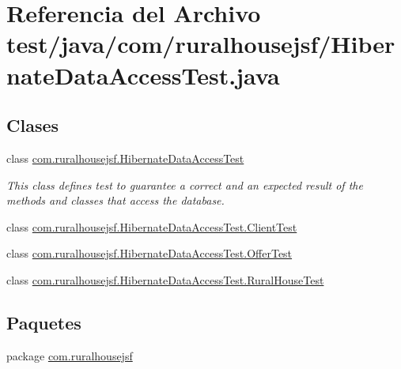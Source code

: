 \hypertarget{a00101}{}\section{Referencia del Archivo test/java/com/ruralhousejsf/\+Hibernate\+Data\+Access\+Test.java}
\label{a00101}
\subsection*{Clases}
\begin{DoxyCompactItemize}
\item 
class \mbox{\hyperlink{a00272}{com.\+ruralhousejsf.\+Hibernate\+Data\+Access\+Test}}
\begin{DoxyCompactList}\small\item\em This class defines test to guarantee a correct and an expected result of the methods and classes that access the database. \end{DoxyCompactList}\item 
class \mbox{\hyperlink{a00276}{com.\+ruralhousejsf.\+Hibernate\+Data\+Access\+Test.\+Client\+Test}}
\item 
class \mbox{\hyperlink{a00280}{com.\+ruralhousejsf.\+Hibernate\+Data\+Access\+Test.\+Offer\+Test}}
\item 
class \mbox{\hyperlink{a00284}{com.\+ruralhousejsf.\+Hibernate\+Data\+Access\+Test.\+Rural\+House\+Test}}
\end{DoxyCompactItemize}
\subsection*{Paquetes}
\begin{DoxyCompactItemize}
\item 
package \mbox{\hyperlink{a00110}{com.\+ruralhousejsf}}
\end{DoxyCompactItemize}
